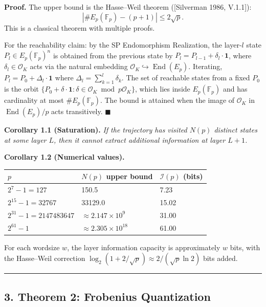 \documentclass[
  11pt,
]{article}
\begin{document}
\textbf{Proof.} The upper bound is the Hasse--Weil theorem ({[}Silverman
1986, V.1.1{]}): \[|\#E_p(\mathbb{F}_p) - (p+1)| \leq 2\sqrt{p}.\] This
is a classical theorem with multiple proofs.

For the reachability claim: by the SP Endomorphism Realization, the
layer-\(l\) state \(P_l \in E_p(\mathbb{F}_p)^n\) is obtained from the
previous state by \(P_l = P_{l-1} + \delta_l \cdot \mathbf{1}\), where
\(\delta_l \in \mathcal{O}_K\) acts via the natural embedding
\(\mathcal{O}_K \hookrightarrow \operatorname{End}(E_p)\). Iterating,
\(P_l = P_0 + \Delta_l \cdot \mathbf{1}\) where
\(\Delta_l = \sum_{k=1}^l \delta_k\). The set of reachable states from a
fixed \(P_0\) is the orbit
\(\{P_0 + \delta \cdot \mathbf{1} : \delta \in \mathcal{O}_K \bmod p\mathcal{O}_K\}\),
which lies inside \(E_p(\mathbb{F}_p)\) and has cardinality at most
\(\#E_p(\mathbb{F}_p)\). The bound is attained when the image of
\(\mathcal{O}_K\) in \(\operatorname{End}(E_p)/p\) acts transitively.
\(\blacksquare\)

\textbf{Corollary 1.1 (Saturation).} \emph{If the trajectory has visited
\(N(p)\) distinct states at some layer \(L\), then it cannot extract
additional information at layer \(L+1\).}

\textbf{Corollary 1.2 (Numerical values).}

\begin{longtable}[]{@{}lll@{}}
\toprule
\(p\) & \(N(p)\) upper bound & \(\mathcal{I}(p)\) (bits)\tabularnewline
\midrule
\endhead
\(2^7 - 1 = 127\) & 150.5 & 7.23\tabularnewline
\(2^{15} - 1 = 32767\) & 33129.0 & 15.02\tabularnewline
\(2^{31} - 1 = 2147483647\) & \(\approx 2.147 \times 10^9\) &
31.00\tabularnewline
\(2^{61} - 1\) & \(\approx 2.305 \times 10^{18}\) & 61.00\tabularnewline
\bottomrule
\end{longtable}

For each wordsize \(w\), the layer information capacity is approximately
\(w\) bits, with the Hasse--Weil correction
\(\log_2(1 + 2/\sqrt{p}) \approx 2/(\sqrt{p} \ln 2)\) bits added.

\begin{center}\rule{0.5\linewidth}{0.5pt}\end{center}

\hypertarget{theorem-2-frobenius-quantization}{%
\subsection{3. Theorem 2: Frobenius
Quantization}\label{theorem-2-frobenius-quantization}}
\end{document}
